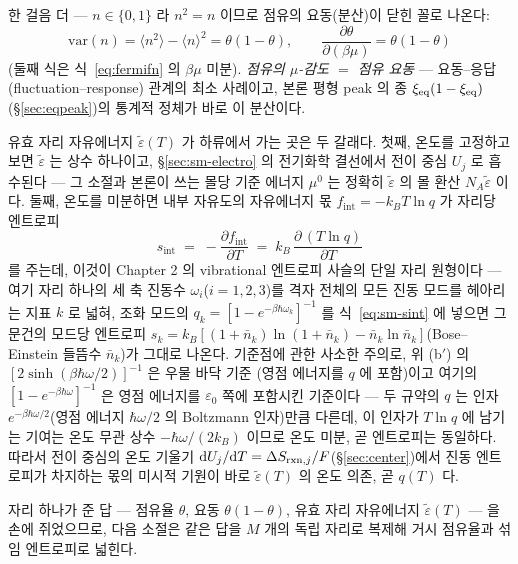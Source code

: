 한 걸음 더 --- $n\in\{0,1\}$ 라 $n^2=n$ 이므로 점유의 요동(분산)이 닫힌 꼴로 나온다:
\begin{equation}
\mathrm{var}(n)=\langle n^2\rangle-\langle n\rangle^2=\theta(1-\theta),
\qquad
\frac{\partial\theta}{\partial(\beta\mu)}=\theta(1-\theta)
\label{eq:sm-flucres}
\end{equation}
(둘째 식은 식~\eqref{eq:fermifn} 의 $\beta\mu$ 미분). \emph{점유의 $\mu$-감도 $=$ 점유 요동} --- 요동--응답
(fluctuation--response) 관계의 최소 사례이고, 본론 평형 peak 의 종 $\xi_{\mathrm{eq}}(1-\xi_{\mathrm{eq}})$(\S\ref{sec:eqpeak})의
통계적 정체가 바로 이 분산이다.

유효 자리 자유에너지 $\tilde\varepsilon(T)$ 가 하류에서 가는 곳은 두 갈래다. 첫째, 온도를 고정하고 보면
$\tilde\varepsilon$ 는 상수 하나이고, \S\ref{sec:sm-electro} 의 전기화학 결선에서 전이 중심 $U_j$ 로
흡수된다 --- 그 소절과 본론이 쓰는 몰당 기준 에너지 $\mu^0$ 는 정확히 $\tilde\varepsilon$ 의 몰 환산
$N_A\tilde\varepsilon$ 이다. 둘째, 온도를 미분하면 내부 자유도의 자유에너지 몫
$f_\mathrm{int}=-k_BT\ln q$ 가 자리당 엔트로피
\begin{equation}
s_\mathrm{int}\;=\;-\frac{\partial f_\mathrm{int}}{\partial T}
\;=\;k_B\,\frac{\partial\,(T\ln q)}{\partial T}
\label{eq:sm-sint}
\end{equation}
를 주는데, 이것이 Chapter 2 의 vibrational 엔트로피 사슬의 단일 자리 원형이다 --- 여기 자리 하나의
세 축 진동수 $\omega_i$($i=1,2,3$)를 격자 전체의 모든 진동 모드를 헤아리는 지표 $k$ 로 넓혀, 조화 모드의
$q_k=[1-e^{-\beta\hbar\omega_k}]^{-1}$ 를 식~\eqref{eq:sm-sint} 에 넣으면 그 문건의 모드당 엔트로피
$s_k=k_B[(1+\bar n_k)\ln(1+\bar n_k)-\bar n_k\ln\bar n_k]$(Bose--Einstein 들뜸수 $\bar n_k$)가 그대로
나온다. 기준점에 관한 사소한 주의로, 위 (b$'$) 의 $[2\sinh(\beta\hbar\omega/2)]^{-1}$ 은 우물 바닥 기준
(영점 에너지를 $q$ 에 포함)이고 여기의 $[1-e^{-\beta\hbar\omega}]^{-1}$ 은 영점 에너지를
$\varepsilon_0$ 쪽에 포함시킨 기준이다 --- 두 규약의 $q$ 는 인자 $e^{-\beta\hbar\omega/2}$(영점 에너지
$\hbar\omega/2$ 의 Boltzmann 인자)만큼 다른데, 이 인자가 $T\ln q$ 에 남기는 기여는 온도 무관 상수
$-\hbar\omega/(2k_B)$ 이므로 온도 미분, 곧 엔트로피는 동일하다. 따라서 전이 중심의 온도 기울기
$\mathrm{d} U_j/\mathrm{d} T=\Delta S_{\mathrm{rxn},j}/F$(\S\ref{sec:center})에서 진동
엔트로피가 차지하는 몫의 미시적 기원이 바로 $\tilde\varepsilon(T)$ 의 온도 의존, 곧 $q(T)$ 다.

자리 하나가 준 답 --- 점유율 $\theta$, 요동 $\theta(1-\theta)$, 유효 자리 자유에너지
$\tilde\varepsilon(T)$ --- 을 손에 쥐었으므로, 다음 소절은 같은 답을 $M$ 개의 독립 자리로 복제해 거시
점유율과 섞임 엔트로피로 넓힌다.

